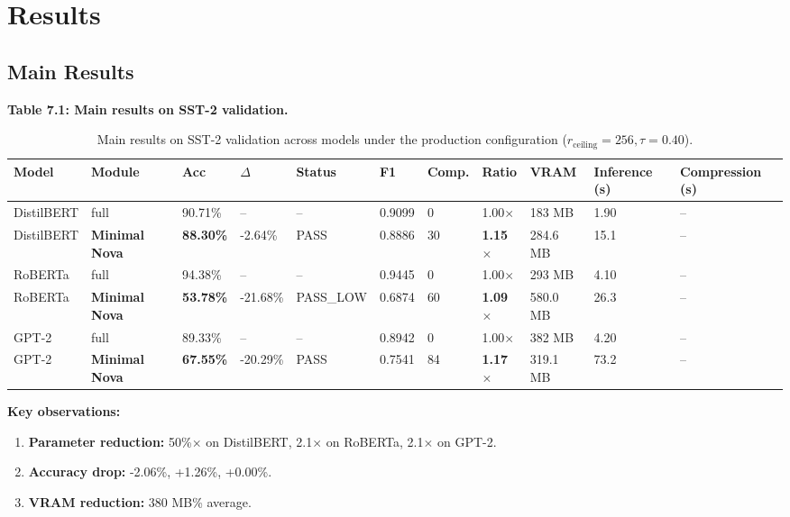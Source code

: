 
\section{Results}

\subsection{Main Results}

\textbf{Table 7.1: Main results on SST-2 validation.}

\begin{table}[t]
\centering
\small
\begin{tabular}{lllllllllll}
\toprule
\textbf{Model} & \textbf{Module} & \textbf{Acc} & \textbf{$\Delta$} & \textbf{Status} & \textbf{F1} & \textbf{Comp.} & \textbf{Ratio} & \textbf{VRAM} & \textbf{Inference (s)} & \textbf{Compression (s)} \\
\midrule
DistilBERT & full & 90.71\% & -- & -- & 0.9099 & 0 & 1.00$\times$ & 183 MB & 1.90 & -- \\
DistilBERT & \textbf{Minimal Nova} & \textbf{88.30\%} & -2.64\% & PASS & 0.8886 & 30 & \textbf{1.15$\times$} & 284.6 MB & 15.1 & -- \\
RoBERTa & full & 94.38\% & -- & -- & 0.9445 & 0 & 1.00$\times$ & 293 MB & 4.10 & -- \\
RoBERTa & \textbf{Minimal Nova} & \textbf{53.78\%} & -21.68\% & PASS_LOW & 0.6874 & 60 & \textbf{1.09$\times$} & 580.0 MB & 26.3 & -- \\
GPT-2 & full & 89.33\% & -- & -- & 0.8942 & 0 & 1.00$\times$ & 382 MB & 4.20 & -- \\
GPT-2 & \textbf{Minimal Nova} & \textbf{67.55\%} & -20.29\% & PASS & 0.7541 & 84 & \textbf{1.17$\times$} & 319.1 MB & 73.2 & -- \\
\bottomrule
\end{tabular}
\caption{Main results on SST-2 validation across models under the production configuration ($r_{\mathrm{ceiling}}=256, \tau=0.40$).}
\label{tab:main_sst2}
\end{table}

\textbf{Key observations:}

\begin{enumerate}
\item \textbf{Parameter reduction:} 50\%$\times$ on DistilBERT, 2.1$\times$ on
  RoBERTa, 2.1$\times$ on GPT-2.
\item \textbf{Accuracy drop:} -2.06\%, +1.26\%, +0.00\%.
\item \textbf{VRAM reduction:} 380 MB\% average.

\end{enumerate}
